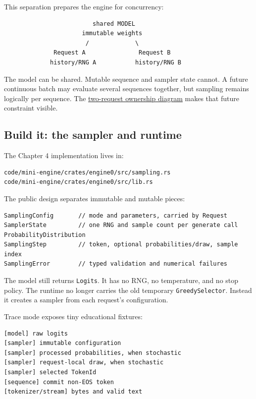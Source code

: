 \documentclass[
  10pt,
]{article}
\begin{document}
This separation prepares the engine for concurrency:

\begin{verbatim}
                         shared MODEL
                      immutable weights
                       /             \
              Request A               Request B
             history/RNG A           history/RNG B
\end{verbatim}

The model can be shared. Mutable sequence and sampler state cannot. A
future continuous batch may evaluate several sequences together, but
sampling remains logically per sequence. The
\href{https://github.com/hermonai/inside-the-llm-engine/blob/astra-visual-rewrite/diagrams/sampling/model-two-requests.txt}{two-request
ownership diagram} makes that future constraint visible.

\subsection{Build it: the sampler and
runtime}\label{build-it-the-sampler-and-runtime}

The Chapter 4 implementation lives in:

\begin{verbatim}
code/mini-engine/crates/engine0/src/sampling.rs
code/mini-engine/crates/engine0/src/lib.rs
\end{verbatim}

The public design separates immutable and mutable pieces:

\begin{verbatim}
SamplingConfig       // mode and parameters, carried by Request
SamplerState         // one RNG and sample count per generate call
ProbabilityDistribution
SamplingStep         // token, optional probabilities/draw, sample index
SamplingError        // typed validation and numerical failures
\end{verbatim}

The model still returns \texttt{Logits}. It has no RNG, no temperature,
and no stop policy. The runtime no longer carries the old temporary
\texttt{GreedySelector}. Instead it creates a sampler from each
request's configuration.

Trace mode exposes tiny educational fixtures:

\begin{verbatim}
[model] raw logits
[sampler] immutable configuration
[sampler] processed probabilities, when stochastic
[sampler] request-local draw, when stochastic
[sampler] selected TokenId
[sequence] commit non-EOS token
[tokenizer/stream] bytes and valid text
\end{verbatim}
\end{document}
